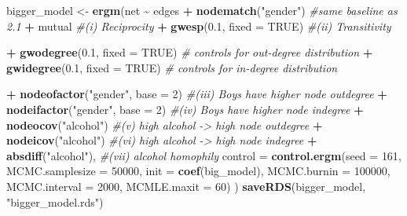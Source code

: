 \documentclass[
]{article}
\newenvironment{Shaded}{\begin{snugshade}}{\end{snugshade}}
\newcommand{\AttributeTok}[1]{\textcolor[rgb]{0.13,0.29,0.53}{#1}}
\newcommand{\CommentTok}[1]{\textcolor[rgb]{0.56,0.35,0.01}{\textit{#1}}}
\newcommand{\ConstantTok}[1]{\textcolor[rgb]{0.56,0.35,0.01}{#1}}
\newcommand{\DecValTok}[1]{\textcolor[rgb]{0.00,0.00,0.81}{#1}}
\newcommand{\FloatTok}[1]{\textcolor[rgb]{0.00,0.00,0.81}{#1}}
\newcommand{\FunctionTok}[1]{\textcolor[rgb]{0.13,0.29,0.53}{\textbf{#1}}}
\newcommand{\NormalTok}[1]{#1}
\newcommand{\OtherTok}[1]{\textcolor[rgb]{0.56,0.35,0.01}{#1}}
\newcommand{\SpecialCharTok}[1]{\textcolor[rgb]{0.81,0.36,0.00}{\textbf{#1}}}
\newcommand{\StringTok}[1]{\textcolor[rgb]{0.31,0.60,0.02}{#1}}
\begin{document}
\begin{Shaded}
\begin{Highlighting}[]
\NormalTok{bigger\_model }\OtherTok{\textless{}{-}} \FunctionTok{ergm}\NormalTok{(net }\SpecialCharTok{\textasciitilde{}}\NormalTok{ edges }\SpecialCharTok{+} \FunctionTok{nodematch}\NormalTok{(}\StringTok{"gender"}\NormalTok{) }\CommentTok{\#same baseline as 2.1}
               \SpecialCharTok{+}\NormalTok{ mutual }\CommentTok{\#(i) Reciprocity}
               \SpecialCharTok{+} \FunctionTok{gwesp}\NormalTok{(}\FloatTok{0.1}\NormalTok{, }\AttributeTok{fixed =} \ConstantTok{TRUE}\NormalTok{) }\CommentTok{\#(ii) Transitivity}
               
               \SpecialCharTok{+} \FunctionTok{gwodegree}\NormalTok{(}\FloatTok{0.1}\NormalTok{, }\AttributeTok{fixed =} \ConstantTok{TRUE}\NormalTok{)    }\CommentTok{\# controls for out{-}degree distribution}
               \SpecialCharTok{+} \FunctionTok{gwidegree}\NormalTok{(}\FloatTok{0.1}\NormalTok{, }\AttributeTok{fixed =} \ConstantTok{TRUE}\NormalTok{)    }\CommentTok{\# controls for in{-}degree distribution}
               
               \SpecialCharTok{+} \FunctionTok{nodeofactor}\NormalTok{(}\StringTok{"gender"}\NormalTok{, }\AttributeTok{base =} \DecValTok{2}\NormalTok{) }\CommentTok{\#(iii) Boys have higher node outdegree}
               \SpecialCharTok{+} \FunctionTok{nodeifactor}\NormalTok{(}\StringTok{"gender"}\NormalTok{, }\AttributeTok{base =} \DecValTok{2}\NormalTok{) }\CommentTok{\#(iv) Boys have higher node indegree}
               \SpecialCharTok{+} \FunctionTok{nodeocov}\NormalTok{(}\StringTok{"alcohol"}\NormalTok{) }\CommentTok{\#(v) high alcohol {-}\textgreater{} high node outdegree}
               \SpecialCharTok{+} \FunctionTok{nodeicov}\NormalTok{(}\StringTok{"alcohol"}\NormalTok{) }\CommentTok{\#(vi) high alcohol {-}\textgreater{} high node indegree}
               \SpecialCharTok{+} \FunctionTok{absdiff}\NormalTok{(}\StringTok{"alcohol"}\NormalTok{), }\CommentTok{\#(vii) alcohol homophily}
               \AttributeTok{control =} \FunctionTok{control.ergm}\NormalTok{(}\AttributeTok{seed =} \DecValTok{161}\NormalTok{, }\AttributeTok{MCMC.samplesize =} \DecValTok{50000}\NormalTok{, }\AttributeTok{init =} \FunctionTok{coef}\NormalTok{(big\_model),}
                  \AttributeTok{MCMC.burnin =} \DecValTok{100000}\NormalTok{, }\AttributeTok{MCMC.interval =} \DecValTok{2000}\NormalTok{, }\AttributeTok{MCMLE.maxit =} \DecValTok{60}\NormalTok{)}
\NormalTok{               )}
\FunctionTok{saveRDS}\NormalTok{(bigger\_model, }\StringTok{"bigger\_model.rds"}\NormalTok{)}
\end{Highlighting}
\end{Shaded}
\end{document}
